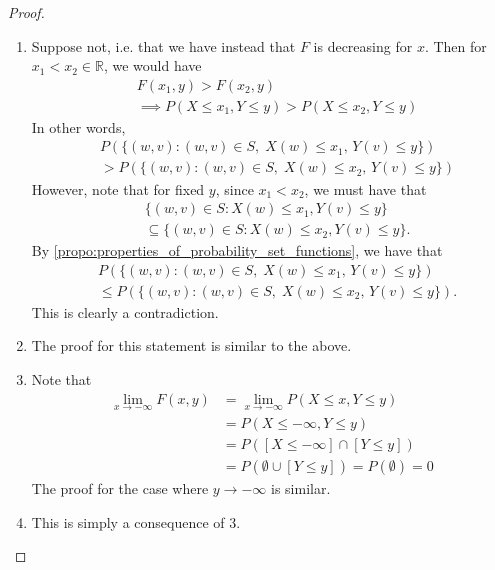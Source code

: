 \documentclass[notoc,notitlepage]{tufte-book}
\begin{document}
\begin{proof}
  \begin{enumerate}
    \item Suppose not, i.e. that we have instead that $F$ is decreasing for $x$. Then for $x_1 < x_2 \in \mathbb{R}$, we would have
      \begin{align*}
        &F(x_1, y) > F(x_2, y) \\
        &\implies P(X \leq x_1, Y \leq y) > P(X \leq x_2, Y \leq y)
      \end{align*}
      In other words,
      \begin{align*}
        &P(\{ (w, v) : (w, v) \in S, \; X(w) \leq x_1 , \, Y(v) \leq y\}) \\
        &> P(\{ (w, v) : (w, v) \in S, \; X(w) \leq x_2 , \, Y(v) \leq y\})
      \end{align*}
      However, note that for fixed $y$, since $x_1 < x_2$, we must have that
      \begin{align*}
        &\{(w, v) \in S : X(w) \leq x_1 , Y(v) \leq y \} \\
        &\subseteq \{(w, v) \in S : X(w) \leq x_2, Y(v) \leq y \}.
      \end{align*}
      By \cref{propo:properties_of_probability_set_functions}, we have that
      \begin{align*}
        &P(\{ (w, v) : (w, v) \in S, \; X(w) \leq x_1 , \, Y(v) \leq y\}) \\
        &\leq P(\{ (w, v) : (w, v) \in S, \; X(w) \leq x_2 , \, Y(v) \leq y\}).
      \end{align*}
      This is clearly a contradiction.
    \item The proof for this statement is similar to the above.
    \item Note that
      \begin{align*}
        \lim_{x \to -\infty} F(x, y) &= \lim_{x \to - \infty} P(X \leq x, Y \leq y) \\
          &= P(X \leq -\infty, Y \leq y) \\
          &= P([ X \leq -\infty ] \cap [ Y \leq y ]) \\
          &= P( \emptyset \cup [Y \leq y] ) = P(\emptyset) = 0
      \end{align*}
      The proof for the case where $y \to -\infty$ is similar.
    \item This is simply a consequence of 3.
  \end{enumerate}
\end{proof}
\end{document}
